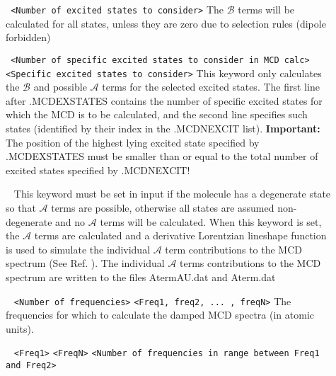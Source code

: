 \begin{description}
\item[] \verb| | \newline
\verb|<Number of excited states to consider>|\newline
The $\mathcal{B}$ terms will be calculated for all states, unless they are zero due to selection rules (dipole forbidden)
\item[] \verb| | \newline
\verb|<Number of specific excited states to consider in MCD calc>|\newline
\verb|<Specific excited states to consider>|\newline
This keyword only calculates the $\mathcal{B}$ and possible $\mathcal{A}$ terms for the selected excited states.
The first line after .MCDEXSTATES contains the number of specific excited states for which the MCD is to be calculated,
and the second line specifies such states (identified by their index in the .MCDNEXCIT list).
{\bf Important:} The position of the highest lying excited state
specified by .MCDEXSTATES must be smaller than or equal to
the total number of excited states specified by .MCDNEXCIT!
\item[] \verb| | \newline
This keyword must be set in input if the molecule has a degenerate state so that $\mathcal{A}$ terms are possible, otherwise all states are assumed non-degenerate and no $\mathcal{A}$ terms will be calculated. When this keyword is set, the $\mathcal{A}$ terms are calculated and a derivative Lorentzian lineshape function is used to simulate the individual $\mathcal{A}$ term contributions to the MCD spectrum (See Ref. \cite{KjaergaardMCD}). The individual $\mathcal{A}$ terms contributions to the MCD spectrum are written to the files AtermAU.dat and Aterm.dat   
\item[] \verb| | \newline
\verb|<Number of frequencies>|\newline
\verb|<Freq1, freq2, ... , freqN>|\newline
The frequencies for which to calculate the damped MCD spectra (in atomic units).
\item[] \verb| | \newline
\verb|<Freq1>|\newline
\verb|<FreqN>|\newline
\verb|<Number of frequencies in range between Freq1 and Freq2>|\newline

\end{description}
